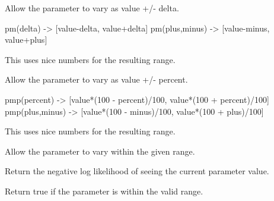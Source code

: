 \documentclass[letterpaper,10pt,english]{sphinxmanual}
\begin{document}
\begin{fulllineitems}

\begin{fulllineitems}
\label{api/mystic.parameter:refl1d.mystic.parameter.BaseParameter.pm}
Allow the parameter to vary as value +/- delta.

pm(delta) -\textgreater{} {[}value-delta, value+delta{]}
pm(plus,minus) -\textgreater{} {[}value-minus, value+plus{]}

This uses nice numbers for the resulting range.

\end{fulllineitems}


\begin{fulllineitems}
\label{api/mystic.parameter:refl1d.mystic.parameter.BaseParameter.pmp}
Allow the parameter to vary as value +/- percent.

pmp(percent) -\textgreater{} {[}value*(100 - percent)/100, value*(100 + percent)/100{]}
pmp(plus,minus) -\textgreater{} {[}value*(100 - minus)/100, value*(100 + plus)/100{]}

This uses nice numbers for the resulting range.

\end{fulllineitems}


\begin{fulllineitems}
\label{api/mystic.parameter:refl1d.mystic.parameter.BaseParameter.range}
Allow the parameter to vary within the given range.

\end{fulllineitems}


\begin{fulllineitems}
\label{api/mystic.parameter:refl1d.mystic.parameter.BaseParameter.residual}
Return the negative log likelihood of seeing the current parameter value.

\end{fulllineitems}


\begin{fulllineitems}
\label{api/mystic.parameter:refl1d.mystic.parameter.BaseParameter.valid}
Return true if the parameter is within the valid range.

\end{fulllineitems}


\end{fulllineitems}
\end{document}
